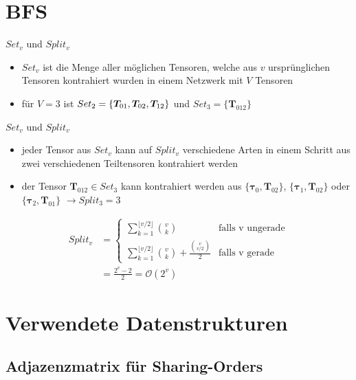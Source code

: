 \documentclass{beamer}
\begin{document}
\section{BFS}

\begin{frame}{$Set_v$ und $Split_v$}
	\begin{itemize}
		\item $Set_v$ ist die Menge aller möglichen Tensoren, welche aus $v$ ursprünglichen Tensoren kontrahiert wurden in einem Netzwerk mit $V$ Tensoren
		\item für $V = 3$ ist $Set_2 = \{\bm{T}_{01}, \bm{T_}{02}, \bm{T}_{12} \}$ und $Set_3 = \{\bm{T}_{012} \}$
	\end{itemize}
\end{frame}

\begin{frame}{$Set_v$ und $Split_v$}
	\begin{itemize}
		\item jeder Tensor aus $Set_v$ kann auf $Split_v$ verschiedene Arten in einem Schritt aus zwei verschiedenen Teiltensoren kontrahiert werden
		\item der Tensor $\bm{T}_{012} \in Set_3$ kann kontrahiert werden aus $\{\bm{\tau}_0, \bm{T}_{02} \}$, $\{\bm{\tau}_{1}, \bm{T}_{02} \}$ oder $\{\bm{\tau}_{2}, \bm{T}_{01} \}$ $\rightarrow Split_3 = 3$
	\end{itemize}
	\begin{align*}
		Split_v & = \begin{cases}
			            \sum^{\lfloor v/2 \rfloor}_{k=1} \binom{v}{k}                            & \text{falls v ungerade} \\
			            \sum^{\lfloor v/2 \rfloor}_{k=1} \binom{v}{k} + \frac{\binom{v}{v/2}}{2} & \text{falls v gerade}
		            \end{cases} \\
		        & = \frac{2^v - 2}{2} = \mathcal{O}(2^v)
	\end{align*}
\end{frame}


\section{Verwendete Datenstrukturen}
\subsection{Adjazenzmatrix für Sharing-Orders}
\end{document}
